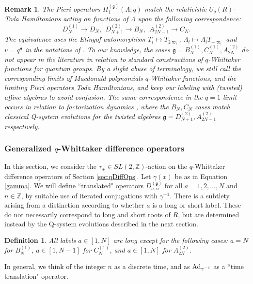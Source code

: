 \documentclass[12pt]{amsart}
\newtheorem{defn}[thm]{Definition}
\newtheorem{remark}[thm]{Remark}
\newcommand{\g}{{\mathfrak{g}}}
\newcommand{\Z}{{\mathbb Z}}
\newcommand{\lL}{{\Lambda}}
\newcommand{\half}{\frac{1}{2}}
\numberwithin{equation}{section}
\begin{document}
\begin{remark}\label{todarem}
The Pieri operators $H_1^{(\g)}(\Lambda;q)$ match the relativistic $U_q(R)$-Toda Hamiltonians acting on functions of $\Lambda$ 
\cite{vDE,gotsy} upon the following correspondence: 
$$D_N^{(1)}\to D_N,\ \  D_{N+1}^{(2)}\to B_N, \ \ A_{2N-1}^{(2)}\to C_N.$$
The equivalence uses the Etingof automorphism \cite{Etingof} $T_i\mapsto T_{2\varpi_i}$, $\lL_i \mapsto \lL_i T_{-\varpi_i}$ and $v=q^\half$ in the notations of \cite{gotsy}.
To our knowledge, the cases $\g=B_N^{(1)},C_N^{(1)},A_{2N}^{(2)}$ do not appear in the literature in relation to
standard constructions of $q$-Whittaker functions for quantum groups. By a slight abuse of terminology, we still call the corresponding limits of Macdonald polynomials $q$-Whittaker functions, and the limiting Pieri operators Toda Hamiltonians, and keep our labeling 
with (twisted) affine algebras to avoid confusion. The same correspondence in the $q=1$ limit occurs in relation to factorization dynamics \cite{Williams}, where the $B_N,C_N$
cases  match classical Q-system evolutions for the twisted algebras $\g=D_{N+1}^{(2)},A_{2N-1}^{(2)}$ respectively.
\end{remark}


\subsubsection{Generalized $q$-Whittaker difference operators}\label{sec:genqW}

%
%
%
%
%

In this section, we consider the $\tau_+\in SL(2,\Z)$-action on the $q$-Whittaker difference operators of Section \ref{sec:qDiffOps}.
Let $\gamma(x)$ be as in Equation \eqref{gamma}. We will define ``translated" operators $D^{(\g)}_{a;n}$ for all $a=1,2,...,N$ and $n\in \Z$,
by suitable use of iterated conjugations with $\gamma^{-1}$. There is a subtlety arising from a distinction according to whether $a$ is a long or short label.
%
%
These do not necessarily correspond to long and short roots of $R$, but are determined instead by the Q-system evolutions described in the next section. 
\begin{defn}\label{longshortlabels}
All labels $a\in[1,N]$ are long except for the following cases:
$a=N$ for $B_N^{(1)}$, $a\in[1,N-1]$ for $C_N^{(1)}$, and $a\in[1,N]$  for $A_{2N}^{(2)}$.
\end{defn}
%

In general, we think of the integer $n$ as a discrete time, and as ${\rm Ad}_{\gamma^{-1}}$
as a ``time translation" operator. 
%
%
%
%
\end{document}
